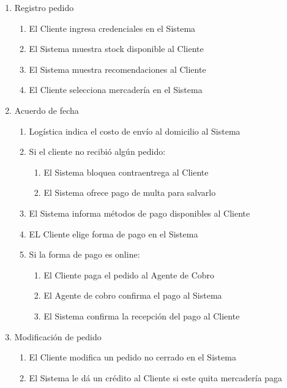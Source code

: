 \begin{enumerate}
 \item Registro pedido
  \begin{enumerate}
    \item El Cliente ingresa credenciales en el Sistema
    \item El Sistema muestra stock disponible al Cliente
    \item El Sistema muestra recomendaciones al Cliente
    \item El Cliente selecciona mercadería en el Sistema
  \end{enumerate}
 
 \item Acuerdo de fecha
  \begin{enumerate}
    \item Logística indica el costo de envío al domicilio al Sistema
    \item Si el cliente no recibi\'o alg\'un pedido: 
      \begin{enumerate}
      \item El Sistema bloquea contraentrega al Cliente
      \item El Sistema ofrece pago de multa para salvarlo
      \end{enumerate}
    \item El Sistema informa métodos de pago disponibles al Cliente
    \item EL Cliente elige forma de pago en el Sistema
    \item Si la forma de pago es online: 
    \begin{enumerate}
      \item El Cliente paga el pedido al Agente de Cobro
      \item El Agente de cobro confirma el pago al Sistema
      \item El Sistema confirma la recepción del pago al Cliente
    \end{enumerate}
  \end{enumerate}
  
 \item Modificaci\'on de pedido
  \begin{enumerate}
    \item El Cliente modifica un pedido no cerrado en el Sistema
    \item El Sistema le dá un crédito al Cliente si este quita mercadería paga
  \end{enumerate}


\end{enumerate}
